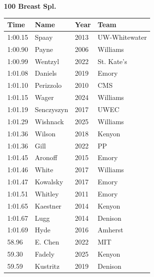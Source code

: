 \noindent\begin{minipage}[t]{0.98\textwidth}
\centering
\textbf{\textcolor{teamprimary}{100 Breast Spl.}}\par
\vspace{0.5em}
\centering
\small
\renewcommand{\arraystretch}{1.0}
\setlength{\tabcolsep}{4pt}
\begin{tabular}{@{}p{2.5cm}p{4.5cm}p{1.5cm}p{2.5cm}@{}}
\toprule
\textbf{Time} & \textbf{Name} & \textbf{Year} & \textbf{Team} \\
\midrule
1:00.15 & Spaay & 2013 & UW-Whitewater \\
1:00.90 & Payne & 2006 & Williams \\
1:00.99 & Wentzyl & 2022 & St. Kate's \\
1:01.08 & Daniels & 2019 & Emory \\
1:01.10 & Perizzolo & 2010 & CMS \\
1:01.15 & Wager & 2024 & Williams \\
1:01.19 & Senczyszyn & 2017 & UWEC \\
1:01.29 & Wishnack & 2025 & Williams \\
1:01.36 & Wilson & 2018 & Kenyon \\
1:01.36 & Gill & 2022 & PP \\
1:01.45 & Aronoff & 2015 & Emory \\
1:01.46 & White & 2017 & Williams \\
1:01.47 & Kowalsky & 2017 & Emory \\
1:01.51 & Whitley & 2011 & Emory \\
1:01.65 & Kaestner & 2014 & Kenyon \\
1:01.67 & Lugg & 2014 & Denison \\
1:01.69 & Hyde & 2016 & Amherst \\
58.96 & E. Chen & 2022 & MIT \\
59.30 & Fadely & 2025 & Kenyon \\
59.59 & Kustritz & 2019 & Denison \\
\bottomrule
\end{tabular}
\end{minipage}
\vspace{1.2em}
